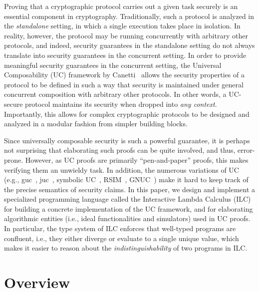 \documentclass[acmsmall,review,anonymous]{acmart}\settopmatter{printfolios=true,printccs=false,printacmref=false}
\begin{document}
Proving that a cryptographic protocol carries out a given task securely is an
essential component in cryptography. Traditionally, such a protocol is analyzed
in the \emph{standalone} setting, in which a single execution takes place in
isolation. In reality, however, the protocol may be running concurrently with
arbitrary other protocols, and indeed, security guarantees in the standalone
setting do not always translate into security guarantees in the concurrent
setting. In order to provide meaningful security guarantees in the concurrent
setting, the Universal Composability (UC) framework by
Canetti~\cite{canetti2001universally} allows the security properties of a
protocol to be defined in such a way that security is maintained under general
concurrent composition with arbitrary other protocols. In other words, a
UC-secure protocol maintains its security when dropped into \emph{any context}.
Importantly, this allows for complex cryptographic protocols to be designed and
analyzed in a modular fashion from simpler building blocks.

Since universally composable security is such a powerful guarantee, it is
perhaps not surprising that elaborating such proofs can be quite involved, and
thus, error-prone. However, as UC proofs are primarily ``pen-and-paper'' proofs,
this makes verifying them an unwieldy task. In addition, the numerous variations
of UC (e.g., guc~\cite{canetti2007universally},
juc~\cite{canetti2003universal}, symbolic UC~\cite{bohl2016symbolic},
RSIM~\cite{backes2007reactive}, GNUC~\cite{hofheinz2015gnuc}) make it hard to
keep track of the precise semantics of security claims. In this paper, we design
and implement a specialized programming language called the Interactive Lambda
Calculus (ILC) for building a concrete implementation of the UC framework, and
for elaborating algorithmic entities (i.e., ideal functionalities and
simulators) used in UC proofs. In particular, the type system of ILC enforces
that well-typed programs are confluent, i.e., they either diverge or evaluate
to a single unique value, which makes it easier to reason about
the \emph{indistinguishability} of two programs in ILC.

\section{Overview}\label{sec:overview}
\end{document}
